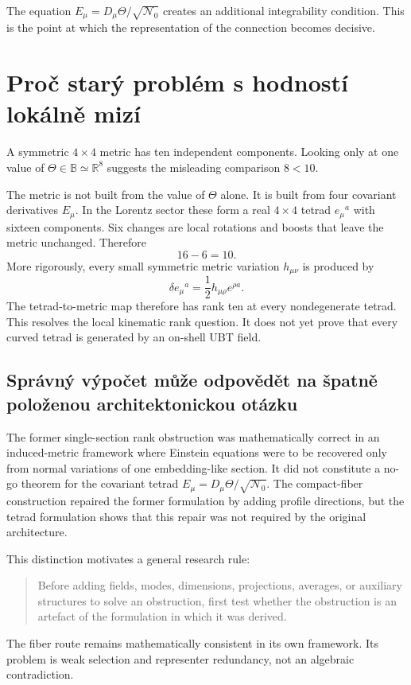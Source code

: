 The equation $E_\mu=D_\mu\Theta/\sqrt{\mathcal N_0}$ creates an additional
integrability condition.  This is the point at which the representation of the
connection becomes decisive.

\section{Proč starý problém s hodností lokálně mizí}
A symmetric $4\times4$ metric has ten independent components.  Looking only at
one value of $\Theta\in\mathbb B\simeq\mathbb R^8$ suggests the misleading
comparison $8<10$.

The metric is not built from the value of $\Theta$ alone.  It is built from four
covariant derivatives $E_\mu$.  In the Lorentz sector these form a real
$4\times4$ tetrad $e_\mu{}^a$ with sixteen components.  Six changes are local
rotations and boosts that leave the metric unchanged.  Therefore
\[
 16-6=10.
\]
More rigorously, every small symmetric metric variation $h_{\mu\nu}$ is
produced by
\[
 \delta e_\mu{}^a=\frac12 h_{\mu\rho}e^{\rho a}.
\]
The tetrad-to-metric map therefore has rank ten at every nondegenerate tetrad.
This resolves the local kinematic rank question.  It does not yet prove that
every curved tetrad is generated by an on-shell UBT field.

\subsection{Správný výpočet může odpovědět na špatně položenou architektonickou otázku}
The former single-section rank obstruction was mathematically correct in an
induced-metric framework where Einstein equations were to be recovered only
from normal variations of one embedding-like section.  It did not constitute a
no-go theorem for the covariant tetrad $E_\mu=D_\mu\Theta/\sqrt{\mathcal N_0}$.
The compact-fiber construction repaired the former formulation by adding
profile directions, but the tetrad formulation shows that this repair was not
required by the original architecture.

This distinction motivates a general research rule:

\begin{quote}
Before adding fields, modes, dimensions, projections, averages, or auxiliary
structures to solve an obstruction, first test whether the obstruction is an
artefact of the formulation in which it was derived.
\end{quote}

The fiber route remains mathematically consistent in its own framework.  Its
problem is weak selection and representer redundancy, not an algebraic
contradiction.

